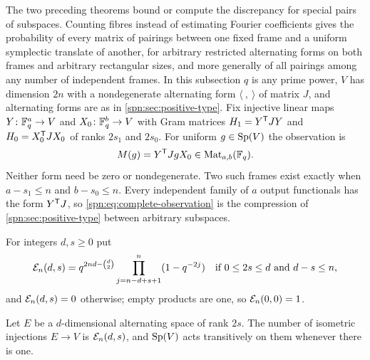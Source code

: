 The two preceding theorems bound or compute the discrepancy for special pairs
of subspaces. Counting fibres instead of estimating Fourier coefficients gives
the probability of every matrix of pairings between one fixed frame and a
uniform symplectic translate of another, for arbitrary restricted alternating
forms on both frames and arbitrary rectangular sizes, and more generally of all
pairings among any number of independent frames. In this subsection $q$
is any prime power, $V$ has dimension $2n$ with a nondegenerate alternating
form $\langle\ ,\ \rangle$ of matrix $J$, and alternating forms are as in
\cref{spn:sec:positive-type}. Fix injective
linear maps $Y\colon\mathbb{F}_q^a\to V$ and $X_0\colon\mathbb{F}_q^b\to V$ with Gram matrices
$H_1=Y^{\mathsf{T}}JY$ and $H_0=X_0^{\mathsf{T}}JX_0$ of ranks $2s_1$ and $2s_0$. For
uniform $g\in\operatorname{Sp}(V)$ the observation is
\begin{equation}\label{spn:eq:complete-observation}
 M(g)=Y^{\mathsf{T}}JgX_0\in\operatorname{Mat}_{a,b}(\mathbb{F}_q).
\end{equation}
Neither form need be zero or nondegenerate. Two such frames exist exactly when
$a-s_1\le n$ and $b-s_0\le n$. Every independent family of $a$ output
functionals has the form $Y^{\mathsf{T}}J$, so \eqref{spn:eq:complete-observation}
is the compression of \cref{spn:sec:positive-type} between arbitrary
subspaces.

For integers $d,s\ge0$ put
\begin{equation}\label{spn:eq:E-count}
 \mathcal{E}_n(d,s)=q^{2nd-\binom d2}\prod_{j=n-d+s+1}^{n}(1-q^{-2j})
 \quad\text{if }0\le2s\le d\text{ and }d-s\le n,
\end{equation}
and $\mathcal{E}_n(d,s)=0$ otherwise; empty products are one, so
$\mathcal{E}_n(0,0)=1$.

\begin{lemma}\label{spn:lem:gram-frames}
Let $E$ be a $d$-dimensional alternating space of rank $2s$. The number of
isometric injections $E\to V$ is $\mathcal{E}_n(d,s)$, and $\operatorname{Sp}(V)$ acts
transitively on them whenever there is one.
\end{lemma}

